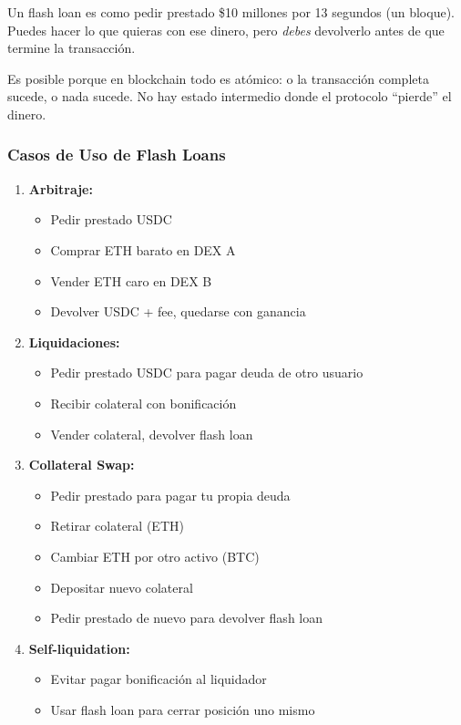 \documentclass[11pt,a4paper,twoside]{book}
\begin{document}
\begin{intuicion}
Un flash loan es como pedir prestado \$10 millones por 13 segundos (un bloque). Puedes hacer lo que quieras con ese dinero, pero \textit{debes} devolverlo antes de que termine la transacci\'on.

Es posible porque en blockchain todo es at\'omico: o la transacci\'on completa sucede, o nada sucede. No hay estado intermedio donde el protocolo ``pierde'' el dinero.
\end{intuicion}

\subsubsection{Casos de Uso de Flash Loans}

\begin{enumerate}
    \item \textbf{Arbitraje:}
    \begin{itemize}
        \item Pedir prestado USDC
        \item Comprar ETH barato en DEX A
        \item Vender ETH caro en DEX B
        \item Devolver USDC + fee, quedarse con ganancia
    \end{itemize}
    
    \item \textbf{Liquidaciones:}
    \begin{itemize}
        \item Pedir prestado USDC para pagar deuda de otro usuario
        \item Recibir colateral con bonificaci\'on
        \item Vender colateral, devolver flash loan
    \end{itemize}
    
    \item \textbf{Collateral Swap:}
    \begin{itemize}
        \item Pedir prestado para pagar tu propia deuda
        \item Retirar colateral (ETH)
        \item Cambiar ETH por otro activo (BTC)
        \item Depositar nuevo colateral
        \item Pedir prestado de nuevo para devolver flash loan
    \end{itemize}
    
    \item \textbf{Self-liquidation:}
    \begin{itemize}
        \item Evitar pagar bonificaci\'on al liquidador
        \item Usar flash loan para cerrar posici\'on uno mismo
    \end{itemize}
\end{enumerate}
\end{document}
